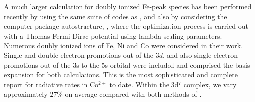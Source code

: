 A much larger calculation for doubly ionized Fe-peak species has been performed recently by \citet{2016A&A...585A.121F} using the same suite of codes as \citet{1984ApJ...277..435H}, and also by considering the computer package {\sc autostructure}, \citep{1974CoPhC...8..270E, 1986JPhB...19.3827B}, where the optimization process is carried out with a Thomas-Fermi-Dirac potential using lambda scaling parameters. Numerous doubly ionized ions of Fe, Ni and Co were considered in their work. Single and double electron promotions out of the $3d$, and also single electron promotions out of the 3s to the 5s orbital were included and comprised the basis expansion for both calculations. This is the most sophisticated and complete report for radiative rates in Co$^{2+}$ to date. Within the 3d$^7$ complex, we vary approximately $27\%$ on average compared with both methods of \citet{2016A&A...585A.121F}.
	
